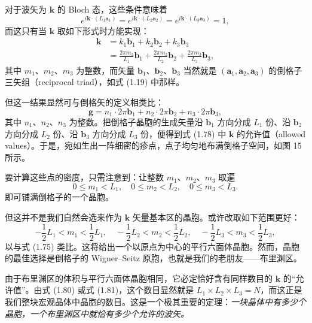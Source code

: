 对于波矢为 $\mathbf{k}$ 的 Bloch 态，这些条件意味着
\begin{equation*}
e^{i\mathbf{k}\cdot(L_1\mathbf{a}_1)}
=e^{i\mathbf{k}\cdot(L_2\mathbf{a}_2)}
=e^{i\mathbf{k}\cdot(L_3\mathbf{a}_3)}=1,
\tag{1.77}
\end{equation*}
而这只有当 $\mathbf{k}$ 取如下形式时方能实现：
\begin{align*}
\mathbf{k} &= k_1\mathbf{b}_1+k_2\mathbf{b}_2+k_3\mathbf{b}_3\\
&= \frac{2\pi m_1}{L_1}\mathbf{b}_1+\frac{2\pi m_2}{L_2}\mathbf{b}_2+\frac{2\pi m_3}{L_3}\mathbf{b}_3,
\tag{1.78}
\end{align*}
其中 $m_1$、$m_2$、$m_3$ 为整数，而矢量 $\mathbf{b}_1$、$\mathbf{b}_2$、$\mathbf{b}_3$ 当然就是 $(\mathbf{a}_1,\mathbf{a}_2,\mathbf{a}_3)$ 的倒格子三矢组（reciprocal triad），如式 (1.19) 中那样。

但这一结果显然可与倒格矢的定义相类比：
\begin{equation*}
\mathbf{g}=n_1\cdot 2\pi\mathbf{b}_1+n_2\cdot 2\pi\mathbf{b}_2+n_3\cdot 2\pi\mathbf{b}_3,
\tag{1.79}
\end{equation*}
其中 $n_1$、$n_2$、$n_3$ 为整数。把倒格子晶胞的生成矢量沿 $\mathbf{b}_1$ 方向分成 $L_1$ 份、沿 $\mathbf{b}_2$ 方向分成 $L_2$ 份、沿 $\mathbf{b}_3$ 方向分成 $L_3$ 份，便得到式 (1.78) 中 $\mathbf{k}$ 的允许值（allowed values）。于是，宛如生出一阵细密的疹点，点子均匀地布满倒格子空间，如图 15 所示。

要计算这些点的密度，只需注意到：让整数 $m_1$、$m_2$、$m_3$ 取遍
\begin{equation*}
0\leqslant m_1<L_1,\quad
0\leqslant m_2<L_2,\quad
0\leqslant m_3<L_3.
\tag{1.80}
\end{equation*}
即可铺满倒格子的一个晶胞。

但这并不是我们自然会选来作为 $\mathbf{k}$ 矢量基本区的晶胞。或许改取如下范围更好：
\begin{equation*}
-\frac{1}{2}L_1<m_1<\frac{1}{2}L_1,\quad
-\frac{1}{2}L_2<m_2<\frac{1}{2}L_2,\quad
-\frac{1}{2}L_3<m_3<\frac{1}{2}L_3,
\tag{1.81}
\end{equation*}
以与式 (1.75) 类比。这将给出一个以原点为中心的平行六面体晶胞。然而，晶胞的最佳选择是倒格子的 Wigner–Seitz 原胞，也就是我们的老朋友——布里渊区。


由于布里渊区的体积与平行六面体晶胞相同，它必定恰好含有同样数目的 $\mathbf{k}$ 的“允许值”。由式 (1.80) 或式 (1.81)，这个数目显然就是 $L_1\times L_2\times L_3=N$，而这正是我们整块宏观晶体中晶胞的数目。这是一个极其重要的定理：\emph{一块晶体中有多少个晶胞，一个布里渊区中就恰有多少个允许的波矢。}


